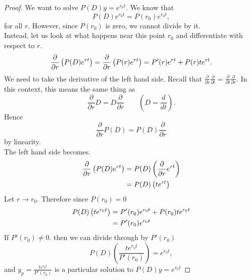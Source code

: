 \begin{proof}
  We want to solve $P(D)y = e^{r_0t}$. We know that
  \begin{equation*}
    P(D)e^{r_0t} = P(r_0)e^{r_0t},
  \end{equation*}
  for all $r$. However, since $P(r_0)$ is zero, we cannot divide by it.\\
  Instead, let us look at what happens near this point $r_0$ and differentiate with respect to $r$.
  \begin{equation*}
    \displaystyle  \displaystyle \frac{\partial }{\partial r}\left(P(D) e^{rt} \right)
    \displaystyle = \displaystyle  \frac{\partial }{\partial r}\left(P(r) e^{rt} \right)
    = P'(r)e^{rt} + P(r)te^{rt}.
  \end{equation*}
  We need to take the derivative of the left hand side. Recall that
  $\frac{\partial }{\partial r}\frac{\partial }{\partial t}
  = \frac{\partial }{\partial t}\frac{\partial }{\partial r}$.
  In this context, this means the same thing as
  \begin{equation*}
    \frac{\partial }{\partial r}D =
    D\frac{\partial }{\partial r} \qquad \left(D = \frac{d}{dt} \right).
  \end{equation*}
  Hence
  \begin{equation*}
    \frac{\partial }{\partial r}P(D) = P(D)\frac{\partial }{\partial r}
  \end{equation*}
  by linearity. \\
  The left hand side becomes.
  \begin{align*}
    \displaystyle  \displaystyle \frac{\partial }{\partial r}\left(P(D) e^{rt} \right)
    \displaystyle &= \displaystyle  P(D) \left( \frac{\partial }{\partial r} e^{rt}\right) \\
    \displaystyle &= \displaystyle  P(D) \left( te^{rt}\right)
  \end{align*}
  Let $r\rightarrow r_0$. Therefore since $P(r _0) = 0$
  \begin{align*}
    \displaystyle  P(D) \left( te^{r_0t}\right)
    \displaystyle &= \displaystyle  P'(r_0)e^{r_0t} + P(r_0)te^{r_0t} \\
    \displaystyle &= \displaystyle  P'(r_0)e^{r_0t}
  \end{align*}
  If $P'(r _0) \neq 0$. then we can divide through by $P'(r _0)$
  \begin{equation*}
    P(D) \left( \frac{te^{r_0t}}{P'(r_0)}\right) = e^{r_0t},
  \end{equation*}
  and $\displaystyle y_ p = \frac{te^{r_0t}}{P'(r_0)}$ is a particular solution to $P(D)y = e^{r_0t}$
\end{proof}

